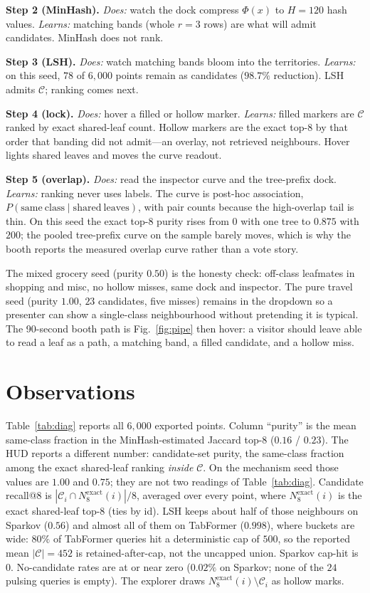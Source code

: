 \documentclass[conference]{IEEEtran}
\begin{document}
\textbf{Step 2 (MinHash).} \emph{Does:} watch the dock compress $\Phi(x)$ to $H{=}120$ hash values. \emph{Learns:} matching bands (whole $r{=}3$ rows) are what will admit candidates. MinHash does not rank.

\textbf{Step 3 (LSH).} \emph{Does:} watch matching bands bloom into the territories. \emph{Learns:} on this seed, $78$ of $6{,}000$ points remain as candidates ($98.7\%$ reduction). LSH admits $\mathcal{C}$; ranking comes next.

\textbf{Step 4 (lock).} \emph{Does:} hover a filled or hollow marker. \emph{Learns:} filled markers are $\mathcal{C}$ ranked by exact shared-leaf count. Hollow markers are the exact top-$8$ by that order that banding did not admit---an overlay, not retrieved neighbours. Hover lights shared leaves and moves the curve readout.

\textbf{Step 5 (overlap).} \emph{Does:} read the inspector curve and the tree-prefix dock. \emph{Learns:} ranking never uses labels. The curve is post-hoc association, $P(\mathrm{same\ class}\mid\mathrm{shared\ leaves})$, with pair counts because the high-overlap tail is thin. On this seed the exact top-$8$ purity rises from $0$ with one tree to $0.875$ with $200$; the pooled tree-prefix curve on the sample barely moves, which is why the booth reports the measured overlap curve rather than a vote story.

The mixed grocery seed (purity $0.50$) is the honesty check: off-class leafmates in shopping and misc, no hollow misses, same dock and inspector. The pure travel seed (purity $1.00$, $23$ candidates, five misses) remains in the dropdown so a presenter can show a single-class neighbourhood without pretending it is typical. The 90-second booth path is Fig.~\ref{fig:pipe} then hover: a visitor should leave able to read a leaf as a path, a matching band, a filled candidate, and a hollow miss.

\section{Observations}

Table~\ref{tab:diag} reports all $6{,}000$ exported points. Column ``purity'' is the mean same-class fraction in the MinHash-estimated Jaccard top-$8$ ($0.16$ / $0.23$). The HUD reports a different number: candidate-set purity, the same-class fraction among the exact shared-leaf ranking \emph{inside} $\mathcal{C}$. On the mechanism seed those values are $1.00$ and $0.75$; they are not two readings of Table~\ref{tab:diag}. Candidate recall@8 is $|\mathcal{C}_i\cap N^{\mathrm{exact}}_8(i)|/8$, averaged over every point, where $N^{\mathrm{exact}}_8(i)$ is the exact shared-leaf top-$8$ (ties by id). LSH keeps about half of those neighbours on Sparkov ($0.56$) and almost all of them on TabFormer ($0.998$), where buckets are wide: $80\%$ of TabFormer queries hit a deterministic cap of $500$, so the reported mean $|\mathcal{C}|=452$ is retained-after-cap, not the uncapped union. Sparkov cap-hit is $0$. No-candidate rates are at or near zero ($0.02\%$ on Sparkov; none of the $24$ pulsing queries is empty). The explorer draws $N^{\mathrm{exact}}_8(i)\setminus\mathcal{C}_i$ as hollow marks.
\end{document}
